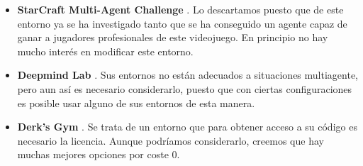 \begin{itemize}
	\item \textbf{StarCraft Multi-Agent Challenge} \cite {starcraft-repo}. Lo descartamos puesto que de este entorno ya se ha investigado tanto que se ha conseguido un agente capaz de ganar a jugadores profesionales de este videojuego. En principio no hay mucho interés en modificar este entorno.

	\item \textbf{Deepmind Lab} \cite{deepmind-repo}. Sus entornos no están adecuados a situaciones multiagente, pero aun así es necesario considerarlo, puesto que con ciertas configuraciones es posible usar alguno de sus entornos de esta manera.

	\item \textbf{Derk's Gym} \cite{derk-repo}. Se trata de un entorno que para obtener acceso a su código es necesario la licencia. Aunque podríamos considerarlo, creemos que hay muchas mejores opciones por coste 0.

\end{itemize}